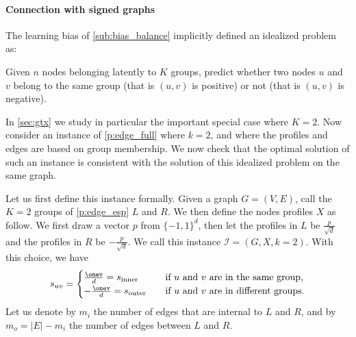 \paragraph{Connection with signed graphs}
\label{par:generalization_of_signed_graphs}

The learning bias of \autoref{sub:bias_balance} implicitly defined an idealized \esp{} problem as:
\begin{problem}
  \label{p:edge_esp}
  Given $n$ nodes belonging latently to $K$ groups, predict whether two nodes $u$ and $v$ belong to
  the same group (that is $(u,v)$ is positive) or not (that is $(u,v)$ is negative).
\end{problem}
In \autoref{sec:gtx} we study in particular the important special case where $K=2$. Now consider an
instance of \autoref{p:edge_full} where $k=2$, and where the profiles and edges are based on group
membership. We now check that the optimal solution of such an instance is consistent with the
solution of this idealized \esp{} problem on the same graph.

Let us first define this instance formally. Given a graph $G=(V,E)$, call the $K=2$ groups of
\autoref{p:edge_esp} $L$ and $R$. We then define the nodes profiles $X$ as follow. We first draw \uar{} a vector $p$
from $\{-1, 1\}^d$, then let the profiles in $L$ be $\frac{p}{\sqrt{d}}$ and the
profiles in $R$ be $-\frac{p}{\sqrt{d}}$. We call this instance $\mathcal{I} = (G, X, k=2)$. With
this choice, we have
\begin{equation*}
  s_{uv} =
  \begin{cases}
    \frac{\onev}{d} = s_{\mathrm{inner}} & \quad \text{if $u$ and $v$ are in the same group,} \\
    -\frac{\onev}{d} = s_{\mathrm{outer}} & \quad \text{if $u$ and $v$ are in different groups.}
  \end{cases}
\end{equation*}
Let us denote by $m_i$ the number of edges that are internal to $L$ and $R$, and by $m_o = |E| -
m_i$ the number of edges between $L$ and $R$.

